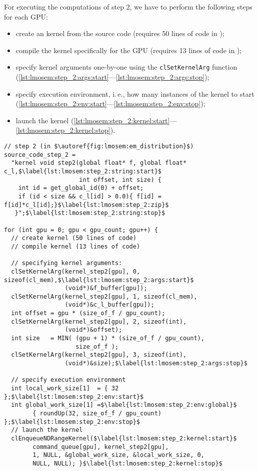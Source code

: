 For executing the computations of step 2, we have to perform the following steps for each GPU:
\begin{itemize}
  \item create an \OpenCL kernel from the source code (requires 50 lines of code in \OpenCL);
  \item compile the kernel specifically for the GPU (requires 13 lines of code in \OpenCL);
  \item specify kernel arguments one-by-one using the \texttt{clSetKernelArg} function (\autoref{lst:lmosem:step_2:args:start}---\autoref{lst:lmosem:step_2:args:stop});
  \item specify execution environment, i.\,e., how many instances of the kernel to start (\autoref{lst:lmosem:step_2:env:start}---\autoref{lst:lmosem:step_2:env:stop});
  \item launch the kernel (\autoref{lst:lmosem:step_2:kernel:start}---\autoref{lst:lmosem:step_2:kernel:stop}).
\end{itemize}
\begin{lstlisting}[float,
  caption={[Implementation of step 2 of the LM OSEM in \OpenCL.]Implementation of step 2 in \OpenCL (omitting error checks for brevity).},
  label={lst:lmosem:step_2}]
// step 2 (in $\autoref{fig:lmosem:em_distribution}$)
source_code_step_2 =
  "kernel void step2(global float* f, global float* c_l,$\label{lst:lmosem:step_2:string:start}$
                     int offset, int size) {
    int id = get_global_id(0) + offset;
    if (id < size && c_l[id] > 0.0){ f[id] = f[id]*c_l[id];}$\label{lst:lmosem:step_2:zip}$
   }";$\label{lst:lmosem:step_2:string:stop}$

for (int gpu = 0; gpu < gpu_count; gpu++) {
  // create kernel (50 lines of code)
  // compile kernel (13 lines of code)

  // specifying kernel arguments:
  clSetKernelArg(kernel_step2[gpu], 0, sizeof(cl_mem),$\label{lst:lmosem:step_2:args:start}$
                 (void*)&f_buffer[gpu]);
  clSetKernelArg(kernel_step2[gpu], 1, sizeof(cl_mem),
                 (void*)&c_l_buffer[gpu]);
  int offset = gpu * (size_of_f / gpu_count);
  clSetKernelArg(kernel_step2[gpu], 2, sizeof(int),
                 (void*)&offset);
  int size   = MIN( (gpu + 1) * (size_of_f / gpu_count),
                    size_of_f );
  clSetKernelArg(kernel_step2[gpu], 3, sizeof(int),
                 (void*)&size);$\label{lst:lmosem:step_2:args:stop}$

  // specify execution environment
  int local_work_size[1]  = { 32 };$\label{lst:lmosem:step_2:env:start}$
  int global_work_size[1] =$\label{lst:lmosem:step_2:env:global}$
        { roundUp(32, size_of_f / gpu_count) };$\label{lst:lmosem:step_2:env:stop}$
  // launch the kernel
  clEnqueueNDRangeKernel($\label{lst:lmosem:step_2:kernel:start}$
        command_queue[gpu], kernel_step2[gpu],
        1, NULL, &global_work_size, &local_work_size, 0,
        NULL, NULL); }$\label{lst:lmosem:step_2:kernel:stop}$
\end{lstlisting}


